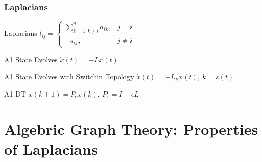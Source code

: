 \documentclass{beamer}
\begin{document}
\begin{frame}
    \frametitle{Laplacians}
    
    
    \begin{block}{Laplacians}
        $l_{ij} = \left\{
            \begin{array}{ll}
                \sum_{k=1,k\ne i}^n a_{ik}, & j=i\\
                -a_{ij}, & j\ne i
            \end{array}\right.$
    \end{block}
    
    \begin{alertblock}{A1 State Evolves}
        $\dot{x}(t) = -Lx(t)$
    \end{alertblock}
    
    
    \begin{block}{A1 State Evolves with Switchin Topology}
        $\dot{x}(t) = -L_kx(t),\ k=s(t)$
    \end{block}
    
    \begin{alertblock}{A1 DT}
        $x(k+1) = P_\epsilon x(k),\ P_\epsilon = I - \epsilon L$
    \end{alertblock}
    
    
    \end{frame}

\section{Algebric Graph Theory: Properties of Laplacians}
\end{document}
